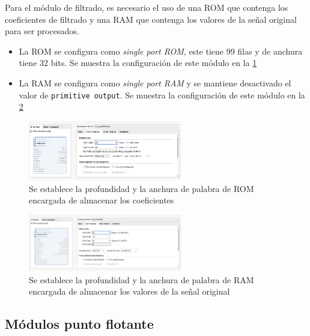 Para el módulo de filtrado, es necesario el uso de una ROM que contenga los coeficientes de filtrado y una RAM que contenga los valores de la señal original para ser procesados.

\begin{itemize}
\item La ROM se configura como \textit{single port ROM}, este tiene 99 filas y de anchura 
tiene 32 bits. Se muestra la configuración de este módulo en la \cref{fig:romcoeficientesconf}
\item La RAM se configura como \textit{single port RAM} y se mantiene desactivado el valor de \texttt{primitive output}.
Se muestra la configuración de este módulo en la \cref{fig:rammuestrasconf}

\end{itemize}

\begin{figure}[h!]
    \centering
    \includegraphics[width=0.6\textwidth]{./Images/img_implementacion_hw/romcoeficientesconf.png}
    \caption{Se establece la profundidad y la anchura de palabra de ROM encargada de almacenar los coeficientes}
    \label{fig:romcoeficientesconf}
\end{figure}

\begin{figure}[h!]
    \centering
    \includegraphics[width=0.6\textwidth]{./Images/img_implementacion_hw/rammuestrasconf.png}
    \caption{Se establece la profundidad y la anchura de palabra de RAM encargada de almacenar los valores de la señal original}
    \label{fig:rammuestrasconf}
\end{figure}
\FloatBarrier

\subsection{Módulos punto flotante}

